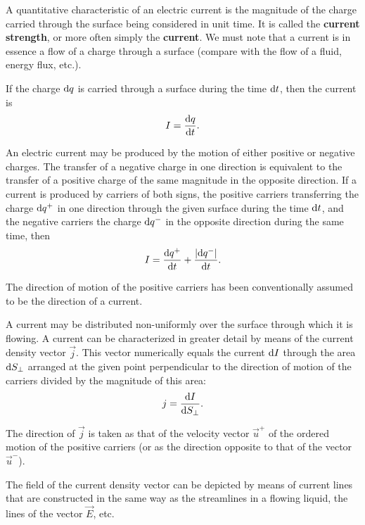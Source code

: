 A quantitative characteristic of an electric current is the magnitude of the charge carried through the surface being considered in unit time. It is called the \textbf{current strength}, or more often simply the \textbf{current}. We must note that a current is in essence a flow of a charge through a surface (compare with the flow of a fluid, energy flux, etc.).

If the charge $\mathrm{d} q$ is carried through a surface during the time $\mathrm{d} t$, then the current is
\begin{equation}\label{eq:5_1}
    I = \dfrac{\mathrm{d} q}{\mathrm{d} t}.
\end{equation}

\noindent
An electric current may be produced by the motion of either positive or negative charges. The transfer of a negative charge in one direction is equivalent to the transfer of a positive charge of the same magnitude in the opposite direction. If a current is produced by carriers of both signs, the positive carriers transferring the charge $\mathrm{d} q^+$ in one direction through the given surface during the time $\mathrm{d} t$, and the negative carriers the charge $\mathrm{d} q^-$ in the opposite direction during the same time, then
\begin{equation*}
    I = \dfrac{\mathrm{d} q^+}{\mathrm{d} t} + \frac{|\mathrm{d} q^-|}{\mathrm{d} t}.
\end{equation*}

The direction of motion of the positive carriers has been conventionally assumed to be the direction of a current.

A current may be distributed non-uniformly over the surface through which it is flowing. A current can be characterized in greater detail by means of the current density vector $\vec{j}$. This vector numerically equals the current $\mathrm{d} I$ through the area $\mathrm{d} S_{\perp}$ arranged at the given point perpendicular to the direction of motion of the carriers divided by the magnitude of this area:
\begin{equation}\label{eq:5_2}
    j = \dfrac{\mathrm{d} I}{\mathrm{d} S_{\perp}}.
\end{equation}

\noindent
The direction of $\vec{j}$ is taken as that of the velocity vector $\vec{u}^+$ of the ordered motion of the positive carriers (or as the direction opposite to that of the vector $\vec{u}^-$).

The field of the current density vector can be depicted by means of current lines that are constructed in the same way as the streamlines in a flowing liquid, the lines of the vector $\vec{E}$, etc.

